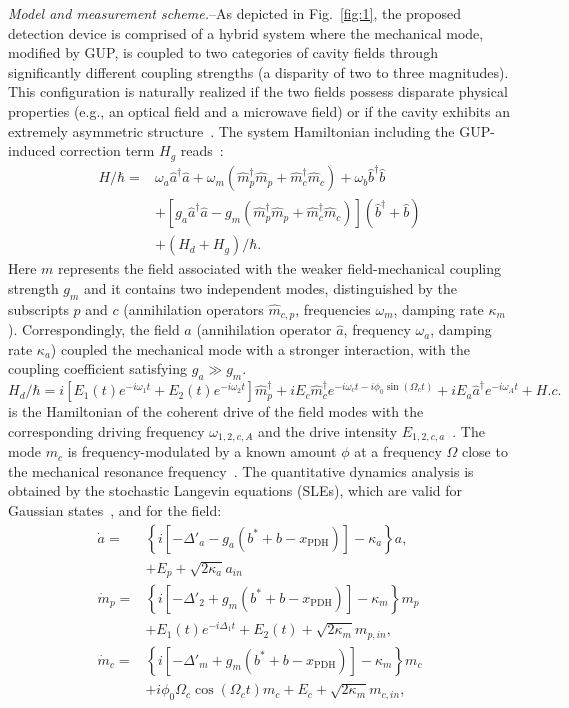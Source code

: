 \documentclass[aps,prl,twocolumn,superscriptaddress]{revtex4-2}
\begin{document}
\textit{Model and measurement scheme.}--As depicted in Fig.~\ref{fig:1}, the proposed detection device  is comprised of a hybrid system where the mechanical mode, modified by GUP, is coupled to two categories of cavity fields through significantly different coupling strengths (a disparity of two to three magnitudes). This configuration is naturally realized if the two fields possess disparate physical properties (e.g., an optical field and a microwave field) or if the cavity exhibits an extremely asymmetric structure~\cite{Supplemental Material}. The system Hamiltonian including the GUP-induced correction term $H_g$ reads~\cite{Aspelmeyer2014}:
\begin{equation}
\begin{split}
H/\hbar=&\omega_a \hat{a}^\dagger\hat{a}+\omega_m (\hat{m}_p^\dagger\hat{m}_p+\hat{m}_c^\dagger\hat{m}_c)+\omega_{b}\hat{b}^\dagger\hat{b}\\&+[g_a\hat{a}^\dagger\hat{a}-g_m(\hat{m}_p^\dagger\hat{m}_p+\hat{m}_c^\dagger\hat{m}_c)](\hat{b}^\dagger+\hat{b})\\&+(H_d+H_g)/\hbar.
\end{split}
\label{eq:system Hamilton}
\end{equation}
Here $m$ represents the field associated with the weaker field-mechanical coupling strength $g_m$ and it contains two independent modes, distinguished by the subscripts $p$ and $c$ (annihilation operators $\hat{m}_{c,p}$, frequencies $\omega_{m}$, damping rate $\kappa_{m}$). Correspondingly, the field $a$ (annihilation operator $\hat{a}$, frequency $\omega_{a}$, damping rate $\kappa_{a}$) coupled the mechanical mode with a stronger interaction, with the coupling coefficient satisfying $g_a\gg g_m$.  $H_d/\hbar=i\left[E_1(t)e^{-i\omega_1 t}+E_2(t) e^{-i\omega_2 t}\right]\hat{m}_p^\dagger+iE_c\hat{m}_c^\dagger e^{-i\omega_c t-i\phi_0\sin(\Omega_c t)}+iE_a\hat{a}^\dagger e^{-i\omega_A t}+H.c.$ is the Hamiltonian of the coherent drive of the field modes with the corresponding driving frequency $\omega_{1,2,c,A}$  and the drive intensity $E_{1,2,c,a}$~\cite{Mari2009}. The mode $m_c$ is frequency-modulated by a known amount $\phi$ at a frequency $\Omega$ close to the mechanical resonance frequency~\cite{Gorodetksy2010}. The quantitative dynamics analysis is obtained by the stochastic Langevin equations (SLEs), which are valid for Gaussian states~\cite{Weedbrook2012,Wang2014}, and for the field:
\begin{equation}
\begin{split}
\dot{a}=&\left\{i\left[-\Delta'_a-g_a(b^*+b-x_{\text{PDH}})\right]-\kappa_a\right\}a,\\&+E_p+\sqrt{2\kappa_a}a_{in}\\
\dot{m}_p=&\left\{i[-\Delta'_2+g_m(b^*+b-x_{\text{PDH}})]-\kappa_m\right\} m_p\\&+E_1(t)e^{-i\Delta_1t}+E_2(t)+\sqrt{2\kappa_m}m_{p,in},\\
\dot{m}_c=&\left\{i\left[-\Delta'_m+g_m(b^*+b-x_{\text{PDH}})\right]-\kappa_m\right\} m_c\\&+i\phi_0\Omega_c\cos(\Omega_c t)m_c+E_c+\sqrt{2\kappa_m}m_{c,in},
\end{split}
\label{eq:cle equation}
\end{equation}
\end{document}
